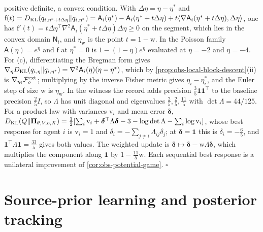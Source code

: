 positive definite, a convex condition. With $\Delta\eta=\eta-\eta^*$ and
$\mathrm f(t)=D_{\mathrm{KL}}(q_{i,\eta^*+t\Delta\eta}\Vert q_{i,\eta^*})
=\mathsf A_i(\eta^*)-\mathsf A_i(\eta^*+t\Delta\eta)+t\langle\nabla\mathsf A_i(\eta^*+t\Delta\eta),\Delta\eta\rangle$,
one has $\mathrm f'(t)=t\Delta\eta^\top\nabla^2\mathsf A_i(\eta^*+t\Delta\eta)\Delta\eta\geq0$ on the segment,
which lies in the convex domain $\mathsf N_i$, and $\eta_{\mathrm w}$ is the point
$t=1-\mathrm w$. In the Poisson family $\mathsf A(\eta)=e^\eta$ and
$\mathrm f$ at $\eta^*=0$ is $1-(1-\eta)e^{\eta}$ evaluated at $\eta=-2$ and
$\eta=-4$. For (c), differentiating the Bregman form gives
$\nabla_{\eta}D_{\mathrm{KL}}(q_{i,\eta}\Vert q_{i,\eta^*})=\nabla^2\mathsf A_i(\eta)(\eta-\eta^*)$,
which by \cref{prop:obs-local-block-descent}(ii) is $\nabla_{\eta_i}\mathcal F^{\mathrm{ext}}_o$;
multiplying by the inverse Fisher metric gives $\eta_i-\eta_i^*$, and the Euler step
of size $\mathrm w$ is $\eta_{\mathrm w}$. In the witness the record adds precision
$\tfrac35\mathbf 1\mathbf 1^\top$ to the baseline precision $\tfrac25I$, so
$\Lambda$ has unit diagonal and eigenvalues $\tfrac25,\tfrac25,\tfrac{11}5$ with
$\det\Lambda=44/125$. For a product law with variances $\mathrm v_i$ and mean error $\boldsymbol\delta$,
$D_{\mathrm{KL}}(Q\Vert\boldsymbol\Pi_{\theta,V,o,X})
=\frac12[\sum_i\mathrm v_i+\boldsymbol\delta^\top\Lambda\boldsymbol\delta-3-\log\det\Lambda-\sum_i\log\mathrm v_i]$, whose
best response for agent $i$ is $\mathrm v_i=1$ and $\delta_i=-\sum_{j\ne i}\Lambda_{ij}\delta_j$; at
$\boldsymbol\delta=\mathbf 1$ this is $\delta_i=-\tfrac65$, and
$\mathbf 1^\top\Lambda\mathbf 1=\tfrac{33}5$ gives both values. The weighted update
is $\boldsymbol\delta\mapsto\boldsymbol\delta-\mathrm w\Lambda\boldsymbol\delta$, which multiplies the component along
$\mathbf 1$ by $1-\tfrac{11}5\mathrm w$. Each sequential best response is a
unilateral improvement of \cref{cor:obs-potential-game}. $\square$

\section{Source-prior learning and posterior tracking}
\label{sec:obs-source-learning-tracking}


